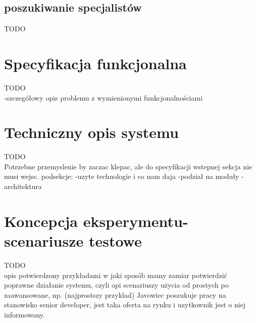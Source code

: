 \documentclass[11pt,a4paper]{article}
\begin{document}
\subsection{poszukiwanie specjalistów}
TODO\\


\section{Specyfikacja funkcjonalna}
TODO\\
-szczegółowy opis problemu z wymienionymi funkcjonalnościami


\section{Techniczny opis systemu}
TODO\\
Potrzebne przemyslenie by zaczac klepac, ale do specyfikacji wstepnej sekcja nie musi wejsc.
podsekcje:
-uzyte technologie i co nam daja
-podział na moduły
-architektura


\section{Koncepcja eksperymentu- scenariusze testowe}
TODO\\
opis potwierdzony przykładami w jaki sposób mamy zamiar potwierdzić poprawne działanie systemu, czyli opi scenariuszy użycia od prostych po zaawansowane, np. (najprostszy przyklad) Javowiec poszukuje pracy na stanowisko senior developer, jest taka oferta na rynku i uzytkownik jest o niej informowany.

	
\end{document}
